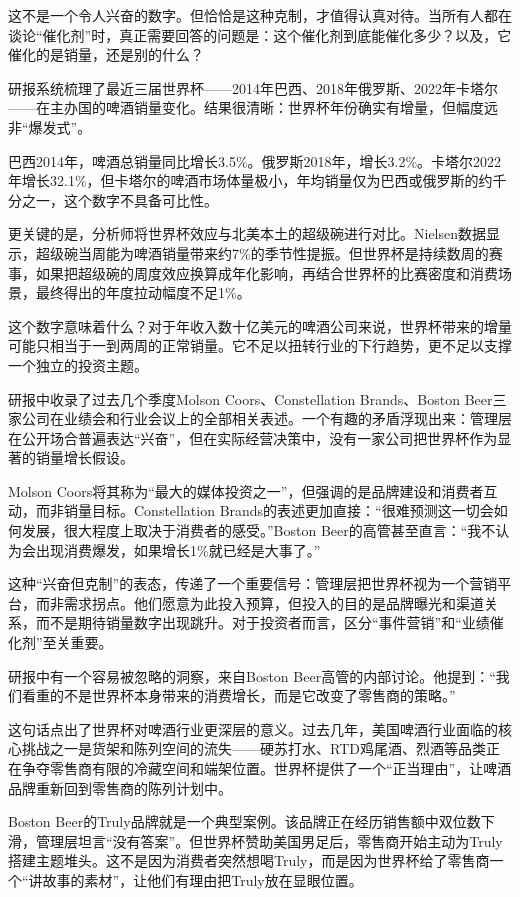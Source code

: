 \documentclass[11pt]{ctexart}
\begin{document}
这不是一个令人兴奋的数字。但恰恰是这种克制，才值得认真对待。当所有人都在谈论“催化剂”时，真正需要回答的问题是：这个催化剂到底能催化多少？以及，它催化的是销量，还是别的什么？

研报系统梳理了最近三届世界杯——2014年巴西、2018年俄罗斯、2022年卡塔尔——在主办国的啤酒销量变化。结果很清晰：世界杯年份确实有增量，但幅度远非“爆发式”。

巴西2014年，啤酒总销量同比增长3.5\%。俄罗斯2018年，增长3.2\%。卡塔尔2022年增长32.1\%，但卡塔尔的啤酒市场体量极小，年均销量仅为巴西或俄罗斯的约千分之一，这个数字不具备可比性。

更关键的是，分析师将世界杯效应与北美本土的超级碗进行对比。Nielsen数据显示，超级碗当周能为啤酒销量带来约7\%的季节性提振。但世界杯是持续数周的赛事，如果把超级碗的周度效应换算成年化影响，再结合世界杯的比赛密度和消费场景，最终得出的年度拉动幅度不足1\%。

这个数字意味着什么？对于年收入数十亿美元的啤酒公司来说，世界杯带来的增量可能只相当于一到两周的正常销量。它不足以扭转行业的下行趋势，更不足以支撑一个独立的投资主题。

研报中收录了过去几个季度Molson Coors、Constellation Brands、Boston Beer三家公司在业绩会和行业会议上的全部相关表述。一个有趣的矛盾浮现出来：管理层在公开场合普遍表达“兴奋”，但在实际经营决策中，没有一家公司把世界杯作为显著的销量增长假设。

Molson Coors将其称为“最大的媒体投资之一”，但强调的是品牌建设和消费者互动，而非销量目标。Constellation Brands的表述更加直接：“很难预测这一切会如何发展，很大程度上取决于消费者的感受。”Boston Beer的高管甚至直言：“我不认为会出现消费爆发，如果增长1\%就已经是大事了。”

这种“兴奋但克制”的表态，传递了一个重要信号：管理层把世界杯视为一个营销平台，而非需求拐点。他们愿意为此投入预算，但投入的目的是品牌曝光和渠道关系，而不是期待销量数字出现跳升。对于投资者而言，区分“事件营销”和“业绩催化剂”至关重要。

研报中有一个容易被忽略的洞察，来自Boston Beer高管的内部讨论。他提到：“我们看重的不是世界杯本身带来的消费增长，而是它改变了零售商的策略。”

这句话点出了世界杯对啤酒行业更深层的意义。过去几年，美国啤酒行业面临的核心挑战之一是货架和陈列空间的流失——硬苏打水、RTD鸡尾酒、烈酒等品类正在争夺零售商有限的冷藏空间和端架位置。世界杯提供了一个“正当理由”，让啤酒品牌重新回到零售商的陈列计划中。

Boston Beer的Truly品牌就是一个典型案例。该品牌正在经历销售额中双位数下滑，管理层坦言“没有答案”。但世界杯赞助美国男足后，零售商开始主动为Truly搭建主题堆头。这不是因为消费者突然想喝Truly，而是因为世界杯给了零售商一个“讲故事的素材”，让他们有理由把Truly放在显眼位置。
\end{document}
